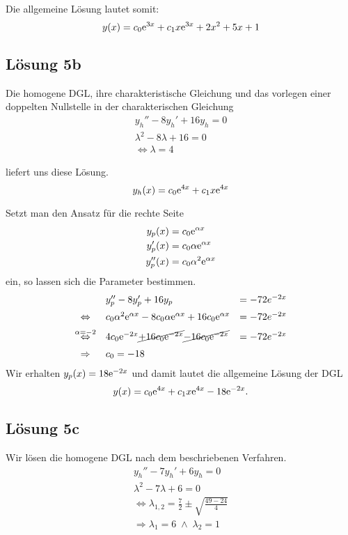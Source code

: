 \documentclass[main.tex]{subfiles}
\begin{document}
Die allgemeine Lösung lautet somit:
$$
    y(x) =  c_0 \mathrm{e}^{3x} + c_1 x \mathrm{e}^{3x} + 2x^2 + 5x + 1
$$

\subsection{Lösung 5b}
Die homogene DGL, ihre charakteristische Gleichung und das vorlegen einer doppelten Nullstelle in der charakterischen Gleichung
\begin{align*}    
    y_h'' - 8y_h' + 16y_h = 0 \\
    \lambda^2 - 8\lambda + 16 = 0 \\
    \Leftrightarrow \lambda = 4
\end{align*}

liefert uns diese Lösung.
$$
    y_h(x) = c_0 \mathrm{e}^{4x} + c_1 x \mathrm{e}^{4x} 
$$

Setzt man den Ansatz für die rechte Seite
\begin{align*}
    y_p(x) &= c_0 \mathrm{e}^{\alpha x} \\
    y_p'(x) &= c_0 \alpha \mathrm{e}^{\alpha x} \\
    y_p''(x) &= c_0 \alpha^2 \mathrm{e}^{\alpha x}
\end{align*}
ein, so lassen sich die Parameter bestimmen.
\begin{equation*}
\begin{array}{cll}
                & y_p'' - 8y_p' + 16y_p &= -72e^{-2x} \\[2mm]
\Leftrightarrow &  c_0 \alpha^2 \ct{e}^{\alpha x}
                - 8  c_0 \alpha \ct{e}^{\alpha x}
                + 16 c_0 \ct{e}^{\alpha x}
                &= -72e^{-2x} \\[2mm]
\overset{\alpha = -2}{\Leftrightarrow} &  4 c_0 \ct{e}^{-2x}
                \cancel{+ 16  c_0 \ct{e}^{-2x}}
                \cancel{- 16 c_0 \ct{e}^{-2x}}
                &= -72e^{-2x} \\[2mm]
\Rightarrow & \multicolumn{2}{l}{ c_0 = -18 }
\end{array}
\end{equation*}
Wir erhalten $y_p(x) = 18 \mathrm{e}^{-2x}$ und damit lautet die allgemeine Lösung der DGL
$$
    y(x) = c_0 \mathrm{e}^{4x} + c_1 x \mathrm{e}^{4x} - 18 \mathrm{e}^{-2x}.
$$

\subsection{Lösung 5c}
Wir lösen die homogene DGL nach dem beschriebenen Verfahren.
\begin{align*}
    y_h'' - 7y_h' + 6y_h = 0 \\
    \lambda^2 - 7\lambda + 6 = 0 \\
    \Leftrightarrow \lambda_{1,2} = \frac{7}{2} \pm \sqrt{\frac{49-24}{4}}\\
    \Rightarrow  \lambda_1 = 6 \;\land\; \lambda_2 = 1
\end{align*}
\end{document}
